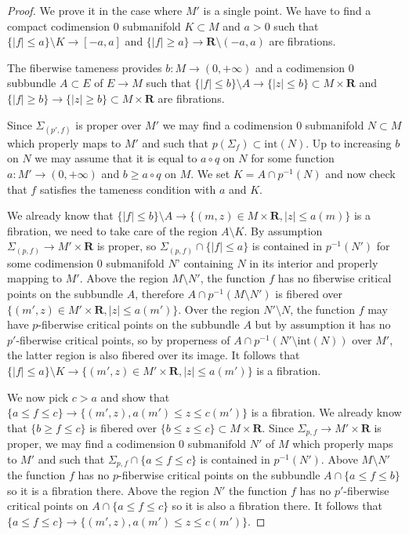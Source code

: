 \documentclass[12pt,a4paper]{article}
\numberwithin{equation}{section}
\theoremstyle{definition}
\theoremstyle{remark}
\newcommand{\R}{\mathbf{R}}
\begin{document}
\begin{proof}
We prove it in the case where $M'$ is a single point. We have to find a compact codimension $0$ submanifold $K\subset M$ and $a>0$ such that $\{|f|\leq a\}\setminus K \to [-a,a]$ and $\{|f|\geq a\}\to \R\setminus(-a,a)$ are fibrations.

The fiberwise tameness provides $b
:M\to (0,+\infty)$ and a codimension $0$ subbundle $A\subset E$ of $E\to M$ such that $\{|f|\leq b\}\setminus A\to \{|z|\leq b\}\subset M\times \R$ and $\{|f|\geq b\}\to \{|z|\geq b\}\subset M\times \R$ are fibrations.

Since $\Sigma_{(p',f)}$ is proper over $M'$ we may  find a  codimension $0$ submanifold $N\subset M$ which properly maps to $M'$ and such that $p(\Sigma_f)\subset \mathrm{int}(N)$.
Up to increasing $b$ on $N$ we may assume that it is equal to $a\circ q$ on $N$ for some function $a:M'\to (0,+\infty)$ and $b\geq a\circ q$ on $M$. We set $K=A\cap p^{-1}(N)$ and now check that $f$ satisfies the tameness condition with $a$ and $K$.

We already know that $\{|f|\leq b\} \setminus A \to \{(m,z)\in M\times \R, |z|\leq a(m)\}$ is a fibration, we need to take care of the region $A\setminus K$. By assumption $\Sigma_{(p,f)}\to M'\times\R$ is proper, so $\Sigma_{(p,f)}\cap\{|f|\leq a\}$ is contained in $p^{-1}(N')$ for some codimension $0$ submanifold $N$' containing $N$ in its interior and properly mapping to $M'$. Above the region $M\setminus N'$, the function $f$ has no fiberwise critical points on the subbundle $A$, therefore $A\cap p^{-1}(M\setminus N')$ is fibered over $\{(m',z)\in M'\times \R, |z|\leq a(m')\}$. Over the region $N'\setminus N$, 
the function $f$ may have $p$-fiberwise critical points on the subbundle $A$ but by assumption it has no $p'$-fiberwise critical points, so by properness of $A\cap p^{-1}(N'\setminus \mathrm{int}(N))$ over $M'$, the latter region is also fibered over its image. It follows that $\{|f|\leq a\}\setminus K \to \{(m',z)\in M'\times \R, |z|\leq a(m')\}$ is a fibration.

We now pick $c>a$ and show that $\{a\leq f\leq c\}\to \{(m',z), a(m')\leq z\leq c(m')\}$ is a fibration. We already know that $\{b\geq f\leq c\}$ is fibered over $\{b\leq z\leq c\}\subset M\times \R$. Since $\Sigma_{p,f}\to M'\times \R$ is proper, we may find a codimension $0$ submanifold $N'$ of $M$ which properly maps to $M'$ and such that $\Sigma_{p,f}\cap\{a\leq f \leq c\}$ is contained in $p^{-1}(N')$. Above $M\setminus N'$ the function $f$ has no $p$-fiberwise critical points on the subbundle $A\cap \{a\leq f\leq b\}$ so it is a fibration there. Above the region $N'$ the function $f$ has no $p'$-fiberwise critical points on $A\cap\{a\leq f \leq c\}$ so it is also a fibration there. It follows that $\{a\leq f\leq c\}\to \{(m',z), a(m')\leq z\leq c(m')\}$.
\end{proof}
\end{document}
